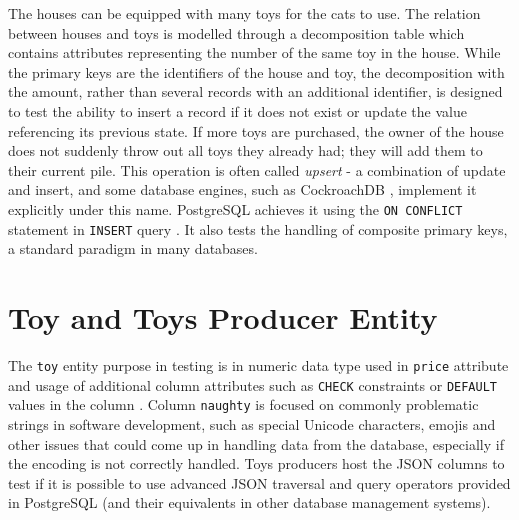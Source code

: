 The houses can be equipped with many toys for the cats to use. The relation
between houses and toys is modelled through a decomposition table which contains
attributes representing the number of the same toy in the house. While the
primary keys are the identifiers of the house and toy, the decomposition with
the amount, rather than several records with an additional identifier, is
designed to test the ability to insert a record if it does not exist or update
the value referencing its previous state. If more toys are purchased, the owner
of the house does not suddenly throw out all toys they already had; they will
add them to their current pile. This operation is often called \textit{upsert} -
a combination of update and insert, and some database engines, such as
CockroachDB \cite{upsertCockroachDB}, implement it explicitly under this name.
PostgreSQL achieves it using the \texttt{ON CONFLICT} statement in
\texttt{INSERT} query \cite{INSERT_postgres_2023}. It also tests the handling of
composite primary keys, a standard paradigm in many databases.

\section{Toy and Toys Producer Entity}
The \texttt{toy} entity purpose in testing is in numeric data type used in
\texttt{price} attribute and usage of additional column attributes such as
\texttt{CHECK} constraints or \texttt{DEFAULT} values in the column
\cite{Constraints_Postgres_2023}. Column \texttt{naughty} is focused on commonly
problematic strings in software development, such as special Unicode characters,
emojis and other issues that could come up in handling data from the database,
especially if the encoding is not correctly handled. Toys producers host the
JSON columns to test if it is possible to use advanced JSON traversal and query
operators provided in PostgreSQL \cite{postgres-json} (and their equivalents in
other database management systems).
